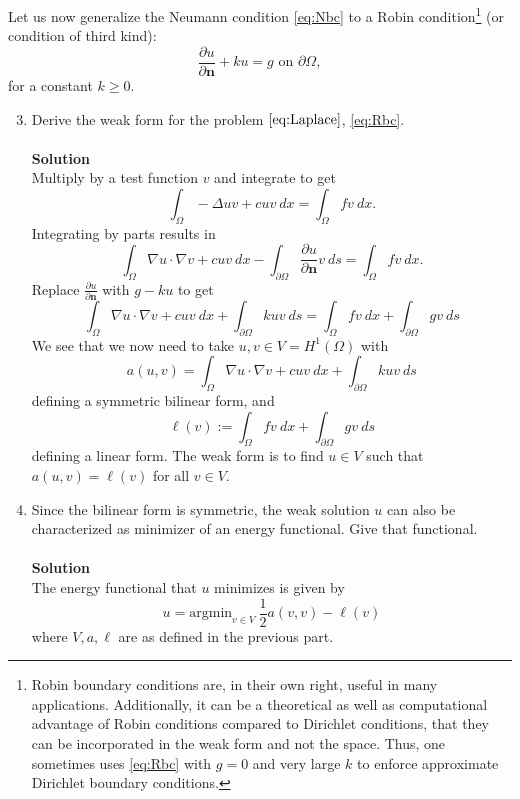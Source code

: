 \documentclass[11pt]{article}
\newcommand{\bs}{\boldsymbol}
\begin{document}
\begin{enumerate}
\begin{enumerate}
    \end{enumerate}
    Let us now generalize the Neumann condition \eqref{eq:Nbc} to a
    Robin condition\footnote{Robin boundary conditions are, in their
      own right, useful in many applications. Additionally, it can be
      a theoretical as well as computational advantage of Robin
      conditions compared to Dirichlet conditions, that they can be
      incorporated in the weak form and not the space. Thus, one
      sometimes uses \eqref{eq:Rbc} with $g=0$ and very large $k$ to
      enforce approximate Dirichlet boundary conditions.} (or
    condition of third kind):
    \begin{equation}\label{eq:Rbc}
   \frac{\partial u}{\partial \bs n} + k u = g \text{ on } \partial \Omega,
    \end{equation}
    for a constant $k\ge 0$.
    \begin{enumerate}
      \setcounter{enumii}{2}
      \item Derive the weak form for the problem $\eqref{eq:Laplace}$,
        \eqref{eq:Rbc}.\\
\\
{\bf Solution}\\
Multiply by a test function $v$ and integrate to get
\[
\int_{\Omega}-\Delta u v  + cuv\ dx = \int_{\Omega}fv\ dx.
\]
Integrating by parts results in
\[
\int_{\Omega} \nabla u \cdot \nabla v + cuv\ dx - \int_{\partial \Omega} \frac{\partial u}{\partial \bs n} v\ ds = \int_{\Omega} fv\ dx.
\]
Replace $\frac{\partial u}{\partial \bs n}$ with $g - ku$ to get
\[
\int_{\Omega} \nabla u \cdot \nabla v + cuv\ dx + \int_{\partial \Omega} k u v\ ds = \int_{\Omega} fv\ dx + \int_{\partial \Omega}gv\ ds
\]
We see that we now need to take $u,v\in V = H^1(\Omega)$ with
\[
a(u,v) = \int_{\Omega} \nabla u \cdot \nabla v + cuv\ dx + \int_{\partial \Omega} k u v\ ds
\]
defining a symmetric bilinear form, and 
\[
\ell(v) := \int_{\Omega} fv\ dx + \int_{\partial \Omega}gv\ ds
\]
defining a linear form.  The weak form is to find $u \in V$ such that $a(u,v) = \ell(v)$ for all $v\in V$.


      \item Since the bilinear form is symmetric, the weak solution
        $u$ can also be characterized as minimizer of an energy
        functional. Give that functional.\\
\\

{\bf Solution}\\
The energy functional that $u$ minimizes is given by
\[
u = \mathrm{argmin}_{v\in V}\  \frac{1}{2}a(v,v) - \ell(v)
\]
where $V,a,\ell$ are as defined in the previous part.


\end{enumerate}
\end{enumerate}
\end{document}
